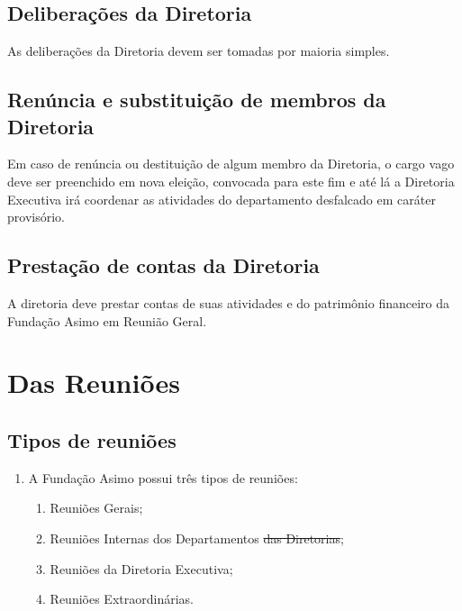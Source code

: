     \subsection{Deliberações da Diretoria}
        As deliberações da Diretoria devem ser tomadas por maioria simples.
    \subsection{Renúncia e substituição de membros da Diretoria}
        Em caso de renúncia ou destituição de algum membro da Diretoria, o cargo vago deve ser preenchido em nova eleição, convocada para este fim e até lá a Diretoria Executiva irá coordenar as atividades do departamento desfalcado em caráter provisório.
    \subsection{Prestação de contas da Diretoria}
        A diretoria deve prestar contas de suas atividades e do patrimônio financeiro da Fundação Asimo em Reunião Geral.
\section{Das Reuniões}
    \subsection{Tipos de reuniões}
    \begin{enumerate}
        \item A Fundação Asimo possui três tipos de reuniões:
        \begin{enumerate}
            \item Reuniões Gerais;
            \item Reuniões Internas {\color{red}dos Departamentos} {\color{cyan} \sout{das Diretorias}};
            \item Reuniões da Diretoria Executiva;
            \item Reuniões Extraordinárias.
        \end{enumerate}
    \end{enumerate}
